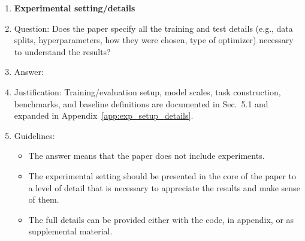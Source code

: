 \documentclass{article}
\begin{document}
\begin{enumerate}
\item {\bf Experimental setting/details}
    \item[] Question: Does the paper specify all the training and test details (e.g., data splits, hyperparameters, how they were chosen, type of optimizer) necessary to understand the results?
    \item[] Answer: \answerYes{} %
    \item[] Justification: Training/evaluation setup, model scales, task construction, benchmarks, and baseline definitions are documented in Sec.~5.1 and expanded in Appendix~\ref{app:exp_setup_details}.
    \item[] Guidelines:
    \begin{itemize}
        \item The answer \answerNA{} means that the paper does not include experiments.
        \item The experimental setting should be presented in the core of the paper to a level of detail that is necessary to appreciate the results and make sense of them.
        \item The full details can be provided either with the code, in appendix, or as supplemental material.
    \end{itemize}


\end{enumerate}
\end{document}
